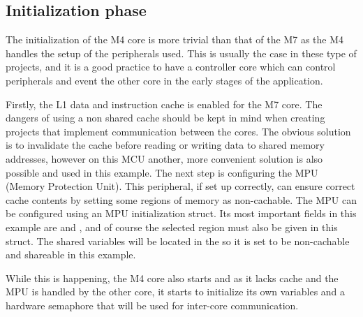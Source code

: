 \subsection{Initialization phase}

The initialization of the M4 core is more trivial than that of the M7 as the M4 handles the setup of the peripherals used. This is usually the case in these type of projects, and it is a good practice to have a controller core which can control peripherals and event the other core in the early stages of the application.

Firstly, the L1 data and instruction cache is enabled for the M7 core. The dangers of using a non shared cache should be kept in mind when creating projects that implement communication between the cores. The obvious solution is to invalidate the cache before reading or writing data to shared memory addresses, however on this MCU another, more convenient solution is also possible and used in this example. The next step is configuring the MPU (Memory Protection Unit). This peripheral, if set up correctly, can ensure correct cache contents by setting some regions of memory as non-cachable. The MPU can be configured using an MPU initialization struct. Its most important fields in this example are  and , and of course the selected region must also be given in this struct. The shared variables will be located in the  so it is set to be non-cachable and shareable in this example.

While this is happening, the M4 core also starts and as it lacks cache and the MPU is handled by the other core, it starts to initialize its own variables and a hardware semaphore that will be used for inter-core communication.
